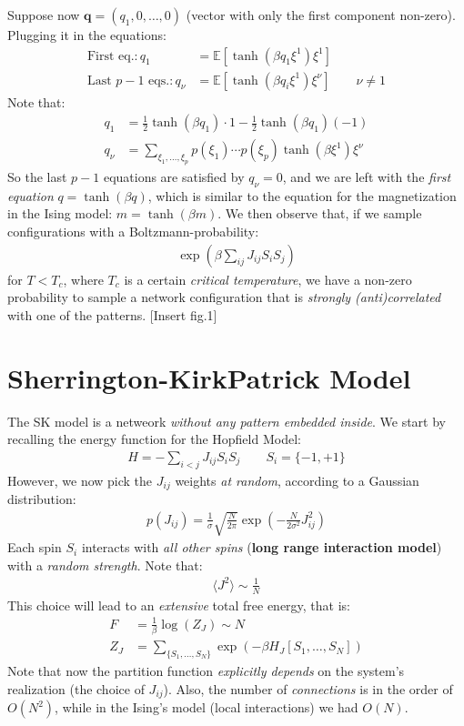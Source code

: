 \documentclass[../template.tex]{subfiles}
\begin{document}
Suppose now $\bm{q} = (q_1, 0,\dots,0)$ (vector with only the first component non-zero). Plugging it in the equations:
\begin{align*}
    \text{First eq.}\colon q_1 &= \mathbb{E}[\tanh(\beta q_1 \xi^1) \xi^1]\\
    \text{Last $p-1$ eqs.}\colon q_\nu &= \mathbb{E}[\tanh (\beta q_i \xi^1)\xi^\nu] \qquad \nu \neq 1
\end{align*} 
Note that:
\begin{align*}
    q_1 &= \frac{1}{2}\tanh (\beta q_1) \cdot 1 - \frac{1}{2} \tanh(\beta q_1)(-1)  \\
    q_\nu &= \sum_{\xi_1, \dots, \xi_p} p(\xi_1)\cdots p(\xi_p) \tanh(\beta \xi^1) \xi^\nu  
\end{align*}
So the last $p-1$ equations are satisfied by $q_\nu = 0$, and we are left with the \textit{first equation} $q=\tanh(\beta q)$, which is similar to the equation for the magnetization in the Ising model: $m = \tanh(\beta m)$. We then observe that, if we sample configurations with a Boltzmann-probability:
\begin{align*}
    \exp(\beta \sum_{ij} J_{ij} S_i S_j)
\end{align*}
for $T < T_c$, where $T_c$ is a certain \textit{critical temperature}, we have a non-zero probability to sample a network configuration that is \textit{strongly (anti)correlated} with one of the patterns. 
[Insert fig.1]

\section{Sherrington-KirkPatrick Model}
The SK model is a netweork \textit{without any pattern embedded inside}. We start by recalling the energy function for the Hopfield Model:
\begin{align*}
    H = -\sum_{i < j} J_{ij} S_i S_j \qquad S_i = \{-1,+1\}
\end{align*} 
However, we now pick the $J_{ij}$ weights \textit{at random}, according to a Gaussian distribution:
\begin{align*}
    p(J_{ij}) = \frac{1}{\sigma} \sqrt{\frac{N}{2\pi} }  \exp\left(-\frac{N}{2 \sigma^2} J_{ij}^2 \right)
\end{align*}  
Each spin $S_i$ interacts with \textit{all other spins} (\textbf{long range interaction model}) with a \textit{random strength}. Note that:
\begin{align*}
    \langle J^2 \rangle \sim \frac{1}{N} 
\end{align*}   
This choice will lead to an \textit{extensive}  total free energy, that is:
\begin{align*}
    F &= \frac{1}{\beta} \log (Z_J) \sim N\\
    Z_J &= \sum_{\{S_1,\dots, S_N\}} \exp\left(-\beta H_J[S_1, \dots, S_N]\right)
\end{align*}
Note that now the partition function \textit{explicitly depends} on the system's realization (the choice of $J_{ij}$). Also, the number of \textit{connections} is in the order of $O(N^2)$, while in the Ising's model (local interactions) we had $O(N)$.\\
\end{document}
